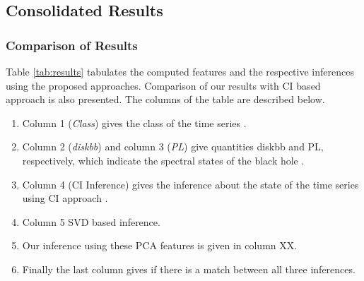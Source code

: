 \documentclass[journal]{IEEEtran}
\begin{document}
\subsection{Consolidated Results}

\subsubsection{ Comparison of Results}
Table \ref{tab:results}  tabulates the computed features and the respective inferences using the proposed approaches. Comparison of our results with CI based approach \cite{Adegoke2018} is also presented. The columns of the table are described below.

\begin{enumerate}
\item Column 1 (\textit{Class}) gives the class of the time series \cite{Adegoke2018}.
\item Column 2 (\textit{diskbb}) and column 3 (\textit{PL}) give quantities diskbb and  PL, respectively, which indicate the spectral states of the black hole \cite{Adegoke2018}.
\item Column 4 (CI Inference) gives the inference about the state of the time series using CI approach \cite{Adegoke2018}.
\item Column 5  SVD based inference.
\item Our inference using these PCA features is given in column XX.
\item Finally the last column gives if there is a match between all three inferences.
\end{enumerate}
\end{document}

